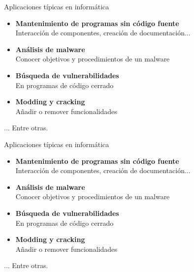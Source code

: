 \documentclass{beamer}
\begin{document}
\begin{frame}{Aplicaciones típicas en informática}
\begin{itemize}
	\item \textbf{Mantenimiento de programas sin código fuente}\\ \hspace{4ex}Interacción de componentes, creación de documentación...
	\item \textbf{Análisis de malware}\\ \hspace{4ex}Conocer objetivos y procedimientos de un malware
	\item \textbf{Búsqueda de vulnerabilidades}\\ \hspace{4ex}En programas de código cerrado
	\item \textbf{Modding y cracking}\\ \hspace{4ex}Añadir o remover funcionalidades
\end{itemize}
\begin{center}... Entre otras.\end{center}
\end{frame}

\begin{frame}{Aplicaciones típicas en informática}
\begin{itemize}
	\item \textbf{Mantenimiento de programas sin código fuente}\\ \hspace{4ex}Interacción de componentes, creación de documentación...
	\item \textbf{Análisis de malware}\\ \hspace{4ex}Conocer objetivos y procedimientos de un malware
	\item \textbf{Búsqueda de vulnerabilidades}\\ \hspace{4ex}En programas de código cerrado
	\item \textbf{\textcolor{structure_color}{Modding y cracking}}\\ \hspace{4ex}Añadir o remover funcionalidades
\end{itemize}
\begin{center}... Entre otras.\end{center}
\end{frame}
\end{document}
